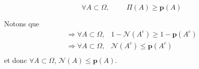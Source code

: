 {\begin{Def}
\label{consist}
\begin{equation*}
\forall A \subset \Omega,  \hspace{1cm} \Pi(A) \geqslant \mathbf{p}(A)
\end{equation*}
\end{Def}
Notons que
\begin{eqnarray*}
\Rightarrow \forall A \subset \Omega, & 1-\mathcal{N}(A^c) \geqslant 1-\mathbf{p}(A^c) \\
\Rightarrow \forall A \subset \Omega, & \mathcal{N}(A^c) \leqslant \mathbf{p}(A^c) \\
\end{eqnarray*}
et donc $\forall A \subset \Omega $, $\mathcal{N}(A) \leqslant \mathbf{p}(A)$. \\

}
